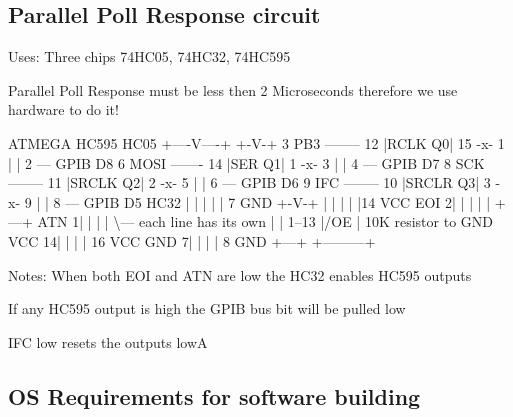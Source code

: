 \subsection*{Parallel Poll Response circuit}


\begin{DoxyItemize}
\item Uses\-: Three chips 74\-H\-C05, 74\-H\-C32, 74\-H\-C595
\item Parallel Poll Response must be less then 2 Microseconds therefore we use hardware to do it!
\end{DoxyItemize}


\begin{DoxyPre}
    ATMEGA               HC595             HC05 
                      +----V----+          +-V-+  
    3 PB3 -------- 12 |RCLK   Q0| 15 -x- 1 |   | 2 --- GPIB D8 
    6 MOSI ------- 14 |SER    Q1| 1  -x- 3 |   | 4 --- GPIB D7 
    8 SCK -------- 11 |SRCLK  Q2| 2  -x- 5 |   | 6 --- GPIB D6 
    9 IFC -------- 10 |SRCLR  Q3| 3  -x- 9 |   | 8 --- GPIB D5 
           HC32       |         |     |    |   | 7 GND 
          +-V-+       |         |     |    |   |14 VCC 
     EOI 2|   |       |         |     |    +---+ 
     ATN 1|   |       |         |     \textbackslash{}--- each line has its own 
          |   | 1--13 |/OE      |          10K resistor to GND 
    VCC 14|   |       |         | 16 VCC 
    GND  7|   |       |         |  8 GND 
          +---+       +---------+ 
\end{DoxyPre}


Notes\-: When both E\-O\-I and A\-T\-N are low the H\-C32 enables H\-C595 outputs
\begin{DoxyItemize}
\item If any H\-C595 output is high the G\-P\-I\-B bus bit will be pulled low
\item I\-F\-C low resets the outputs low\-A 


\end{DoxyItemize}

\subsection*{O\-S Requirements for software building}


